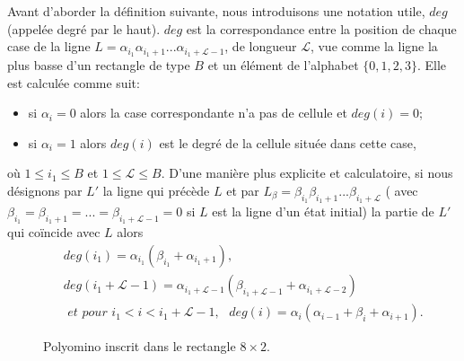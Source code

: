 Avant d'aborder la définition suivante, nous introduisons une notation utile, $deg$ (appelée degré par le haut). $deg$ est la correspondance  entre la position de chaque case de la ligne $L=\alpha_{i_{1}}\alpha_{i_{1}+1}...\alpha_{i_{1}+\mathcal{L}-1}$, de longueur $\mathcal{L}$, vue comme la ligne la plus basse d'un rectangle de type $B$ et un élément de l'alphabet $\{0,1,2,3\}$. Elle est calculée comme suit:
\begin{itemize}
\item si $\alpha_{i}=0$ alors la case correspondante n'a pas de cellule et $deg(i)=0$;

\item si $\alpha_{i}=1$ alors $deg(i)$ est le degré de la cellule située dans cette case,
\end{itemize}
où $1\leq i_{1}\leq B$ et $1\leq\mathcal{L}\leq B$.
D'une manière plus explicite et calculatoire, si nous désignons par $L'$ la ligne qui précède $L$ et par $L_{\beta}=\beta_{i_{1}}\beta_{i_{1}+1}...\beta_{i_{1}+\mathcal{L}}$  ( avec $\beta_{i_{1}}=\beta_{i_{1}+1}=...=\beta_{i_{1}+\mathcal{L}-1}=0$ si $L$ est la ligne d'un état initial) la partie de  $L'$ qui coïncide avec $L$  alors
\begin{eqnarray*}
  & &deg(i_{1})  = \alpha_{i_{1}}(\beta_{i_{1}} + \alpha_{i_{1}+1}),\\
 & &  deg(i_{1}+\mathcal{L}-1) =  \alpha_{i_{1}+\mathcal{L}-1}(\beta_{i_{1}+\mathcal{L}-1} + \alpha_{i_{1}+\mathcal{L}-2})\\
& & \textit{ et pour } i_{1}< i < i_{1}+\mathcal{L}-1, \mbox{ } 
 deg(i)  =  \alpha_{i}(\alpha_{i-1}+ \beta_{i}+\alpha_{i+1}).
 \end{eqnarray*}
 \begin{figure}[!htb]
\begin{minipage}[c]{.16\linewidth}
        \centering
\end{minipage}
\hfill
\begin{minipage}[c]{.66\linewidth}
        \centering
\begin{logicpuzzle}[rows=2,columns=8,color=cyan!100, width=750px,scale=0.5]
\framepuzzle[black!50]
\end{logicpuzzle}
\end{minipage}
\caption{\label{figdegdeg} Polyomino  inscrit dans le rectangle $8\times 2.$ }
\end{figure} 

